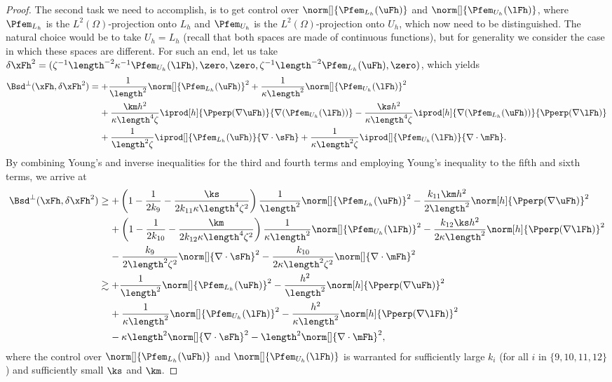 \begin{proof}
The second task we need to accomplish, is to get control over $\norm[]{\Pfem_{L_h}(\uFh)}$ and $\norm[]{\Pfem_{U_h}(\lFh)}$, where $\Pfem_{L_h}$ is the $L^2(\Omega)$-projection onto $L_h$ and $\Pfem_{U_h}$ is the $L^2(\Omega)$-projection onto $U_h$, which now need to be distinguished. The natural choice would be to take $U_h = L_h$ (recall that both spaces are made of continuous functions), but for generality we consider the case in which these spaces are different. For such an end, let us take
$\delta \xFh^2 = (\zeta^{-1}\length^{-2}\kappa^{-1}\Pfem_{U_h}(\lFh)
,\zero,\zero,\zeta^{-1}\length^{-2}\Pfem_{L_h}(\uFh)
,\zero)$, which yields
\begin{align*}
\Bsd^\perp(\xFh,\delta\xFh^2)
&=
+\frac{1}{\length^2}\norm[]{\Pfem_{L_h}(\uFh)}^2
+\frac{1}{\kappa\length^2}\norm[]{\Pfem_{U_h}(\lFh)}^2
\\
&\:\:\:\:\:
+\frac{\km h^2}{\kappa\length^4\zeta}\iprod[h]{\Pperp(\nabla\uFh)}{\nabla(\Pfem_{U_h}(\lFh))}
-\frac{\ks h^2}{\kappa\length^4\zeta}\iprod[h]{\nabla(\Pfem_{L_h}(\uFh))}{\Pperp(\nabla\lFh)}\\
&\:\:\:\:\:
+\frac{1}{\length^2\zeta}\iprod[]{\Pfem_{L_h}(\uFh)}{\nabla\cdot\sFh}
+\frac{1}{\kappa\length^2\zeta}\iprod[]{\Pfem_{U_h}(\lFh)}{\nabla\cdot\mFh}.
\end{align*}
By combining Young's and inverse inequalities for the third and fourth terms and employing Young's inequality to the fifth and sixth terms, we arrive at
\begin{align*}
\Bsd^\perp(\xFh,\delta\xFh^2)
&\geq
+\left(1-\frac{1}{2 k_9}-\frac{\ks}{2 k_{11}\kappa\length^4\zeta^2}\right)\frac{1}{\length^2}\norm[]{\Pfem_{L_h}(\uFh)}^2
-\frac{k_{11} \km h^2}{2\length^2}\norm[h]{\Pperp(\nabla\uFh)}^2\\
&\:\:\:\:\:
+\left(1-\frac{1}{2 k_{10}}-\frac{\km}{2k_{12}\kappa\length^4\zeta^2}\right)\frac{1}{\kappa\length^2}\norm[]{\Pfem_{U_h}(\lFh)}^2
-\frac{k_{12}\ks h^2}{2\kappa\length^2}\norm[h]{\Pperp(\nabla\lFh)}^2\\
&\:\:\:\:\:
-\frac{k_9}{2\length^2\zeta^2}\norm[]{\nabla\cdot\sFh}^2
-\frac{k_{10}}{2\kappa\length^2\zeta^2}\norm[]{\nabla\cdot\mFh}^2\\
&\gtrsim
+\frac{1}{\length^2}\norm[]{\Pfem_{L_h}(\uFh)}^2
-\frac{h^2}{\length^2}\norm[h]{\Pperp(\nabla\uFh)}^2\\
&\:\:\:\:\:
+\frac{1}{\kappa\length^2}\norm[]{\Pfem_{U_h}(\lFh)}^2
-\frac{h^2}{\kappa\length^2}\norm[h]{\Pperp(\nabla\lFh)}^2\\
&\:\:\:\:\:
-\kappa\length^2\norm[]{\nabla\cdot\sFh}^2
-\length^2\norm[]{\nabla\cdot\mFh}^2,
\end{align*}
where the control over $\norm[]{\Pfem_{L_h}(\uFh)}$ and $\norm[]{\Pfem_{U_h}(\lFh)}$ is warranted for sufficiently large $k_i$ (for all $i$ in $\{9,10,11,12\}$) and sufficiently small $\ks$ and $\km$. %


\end{proof}
